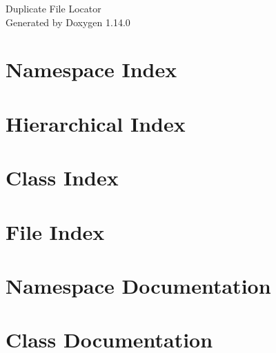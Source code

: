 \documentclass[twoside]{book}
\newcommand{\+}{\discretionary{\mbox{\scriptsize$\hookleftarrow$}}{}{}}
\newcommand{\clearemptydoublepage}{%
    \newpage{\pagestyle{empty}\cleardoublepage}%
  }
\begin{document}
  \raggedbottom
    \hypersetup{pageanchor=false,
                bookmarksnumbered=true,
                pdfencoding=unicode
               }
  \begin{titlepage}
  \vspace*{7cm}
  \begin{center}%
  {\Large Duplicate File Locator}\\
  \vspace*{1cm}
  {\large Generated by Doxygen 1.14.0}\\
  \end{center}
  \end{titlepage}
  \clearemptydoublepage
  \tableofcontents
  \clearemptydoublepage
  \hypersetup{pageanchor=true}
\chapter{Namespace Index}

\chapter{Hierarchical Index}

\chapter{Class Index}

\chapter{File Index}

\chapter{Namespace Documentation}







\chapter{Class Documentation}







\end{document}
